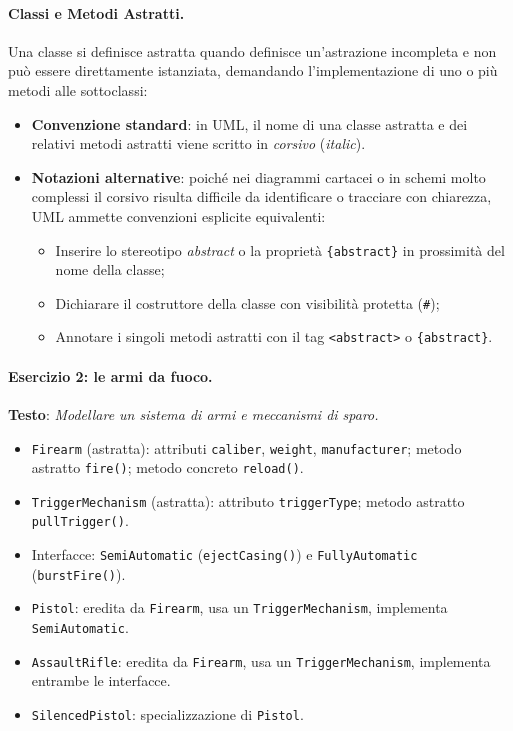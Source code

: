 \documentclass[12pt]{extarticle}
\begin{document}
\paragraph{Classi e Metodi Astratti.}
Una classe si definisce astratta quando definisce un'astrazione incompleta e non può essere direttamente istanziata, demandando l'implementazione di uno o più metodi alle sottoclassi:
\begin{itemize}
    \item \textbf{Convenzione standard}: in UML, il nome di una classe astratta e dei relativi metodi astratti viene scritto in \textit{corsivo} (\textit{italic}).
    \item \textbf{Notazioni alternative}: poiché nei diagrammi cartacei o in schemi molto complessi il corsivo risulta difficile da identificare o tracciare con chiarezza, UML ammette convenzioni esplicite equivalenti:
    \begin{itemize}
        \item Inserire lo stereotipo \guillemotleft\textit{abstract}\guillemotright{} o la proprietà \texttt{\{abstract\}} in prossimità del nome della classe;
        \item Dichiarare il costruttore della classe con visibilità protetta (\texttt{\#});
        \item Annotare i singoli metodi astratti con il tag \texttt{<abstract>} o \texttt{\{abstract\}}.
    \end{itemize}
\end{itemize}

\paragraph{Esercizio 2: le armi da fuoco.}
\textbf{Testo}: \textit{Modellare un sistema di armi e meccanismi di sparo.}
\begin{itemize}
    \item \texttt{Firearm} (astratta): attributi \texttt{caliber}, \texttt{weight}, \texttt{manufacturer}; metodo astratto \texttt{fire()}; metodo concreto \texttt{reload()}.
    \item \texttt{TriggerMechanism} (astratta): attributo \texttt{triggerType}; metodo astratto \texttt{pullTrigger()}.
    \item Interfacce: \texttt{SemiAutomatic} (\texttt{ejectCasing()}) e \texttt{FullyAutomatic} (\texttt{burstFire()}).
    \item \texttt{Pistol}: eredita da \texttt{Firearm}, usa un \texttt{TriggerMechanism}, implementa \texttt{SemiAutomatic}.
    \item \texttt{AssaultRifle}: eredita da \texttt{Firearm}, usa un \texttt{TriggerMechanism}, implementa entrambe le interfacce.
    \item \texttt{SilencedPistol}: specializzazione di \texttt{Pistol}.
\end{itemize}
\end{document}
